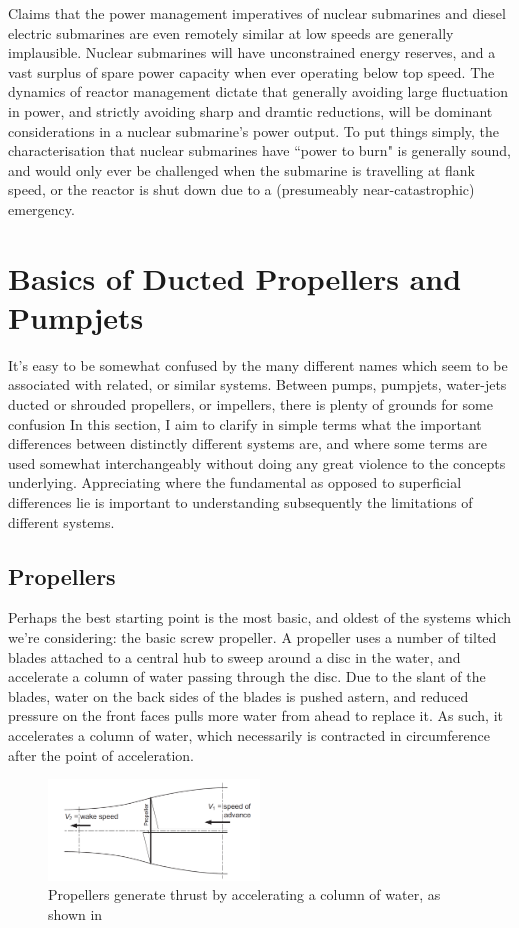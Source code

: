 \documentclass{article}\usepackage[]{graphicx}\usepackage[]{color}
\begin{document}
Claims that the power management imperatives of nuclear submarines and diesel electric submarines are even remotely similar at low speeds are generally implausible.  Nuclear submarines will have unconstrained energy reserves, and a vast surplus of spare power capacity when ever operating below top speed.  The dynamics of reactor management dictate that generally avoiding large fluctuation in power, and strictly avoiding sharp and dramtic reductions, will be dominant considerations in a nuclear submarine's power output.  To put things simply, the characterisation that nuclear submarines have ``power to burn" is generally sound, and would only ever be challenged when the submarine is travelling at flank speed, or the reactor is shut down due to a (presumeably near-catastrophic) emergency.

\newpage  \section{Basics of Ducted Propellers and Pumpjets}
It's easy to be somewhat confused by the many different names which seem to be associated with related, or similar systems.  Between pumps, pumpjets, water-jets ducted or shrouded propellers, or impellers, there is plenty of grounds for some confusion  In this section, I aim to clarify in simple terms what the important differences between distinctly different systems are, and where some terms are used somewhat interchangeably without doing any great violence to the concepts underlying.  Appreciating where the fundamental as opposed to superficial differences lie is important to understanding subsequently the limitations of different systems.

\subsection{Propellers}
Perhaps the best starting point is the most basic, and oldest of the systems which we're considering: the basic screw propeller.  A propeller uses a number of tilted blades attached to a central hub to sweep around a disc in the water, and accelerate a column of water passing through the disc.  Due to the slant of the blades, water on the back sides of the blades is pushed astern, and reduced pressure on the front faces pulls more water from ahead to replace it.  As such, it accelerates a column of water, which necessarily is contracted in circumference after the point of acceleration.

\begin{figure}[h]
\captionsetup{width=0.5\textwidth}
\includegraphics[width=0.5\textwidth, center]{PropellerAction.png}
\caption{Propellers generate thrust by accelerating a column of water, as shown in  \parencite[247]{mollard2011}}
\label{fig:PropellerAction.png}
\end{figure}
\end{document}
